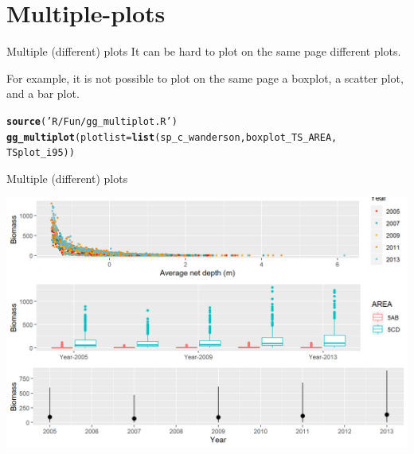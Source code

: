 \documentclass{beamer}\usepackage[]{graphicx}\usepackage[]{color}
\makeatletter
\newcommand{\hlstr}[1]{\textcolor[rgb]{0.192,0.494,0.8}{#1}}%
\newcommand{\hlstd}[1]{\textcolor[rgb]{0.345,0.345,0.345}{#1}}%
\newcommand{\hlkwc}[1]{\textcolor[rgb]{0.333,0.667,0.333}{#1}}%
\newcommand{\hlkwd}[1]{\textcolor[rgb]{0.737,0.353,0.396}{\textbf{#1}}}%
\newenvironment{kframe}{%
 \def\at@end@of@kframe{}%
 \ifinner\ifhmode%
  \def\at@end@of@kframe{\end{minipage}}%
  \begin{minipage}{\columnwidth}%
 \fi\fi%
 \def\FrameCommand##1{\hskip\@totalleftmargin \hskip-\fboxsep
 \colorbox{shadecolor}{##1}\hskip-\fboxsep
     \hskip-\linewidth \hskip-\@totalleftmargin \hskip\columnwidth}%
 \MakeFramed {\advance\hsize-\width
   \@totalleftmargin\z@ \linewidth\hsize
   \@setminipage}}%
 {\par\unskip\endMakeFramed%
 \at@end@of@kframe}
\newenvironment{knitrout}{}{} %
\makeatother
\begin{document}
\section{Multiple-plots}
\begin{frame}[fragile]{Multiple (different) plots}
It can be hard to plot on the same page different plots.

For example, it is not possible to plot on the same page a boxplot, a scatter plot, and a bar plot.

\begin{knitrout}\footnotesize
{}\color{fgcolor}\begin{kframe}
\begin{alltt}
\hlkwd{source}\hlstd{(}\hlstr{'R/Fun/gg_multiplot.R'}\hlstd{)}
\hlkwd{gg_multiplot}\hlstd{(}\hlkwc{plotlist} \hlstd{=} \hlkwd{list}\hlstd{(sp_c_wanderson, boxplot_TS_AREA,}
                             \hlstd{TSplot_i95))}
\end{alltt}
\end{kframe}
\end{knitrout}
\end{frame}

\begin{frame}[fragile]{Multiple (different) plots}
\begin{knitrout}\footnotesize
{}\color{fgcolor}

{\centering \includegraphics[width=.9\linewidth]{figure/multi_plot2-1} 

}



\end{knitrout}
\end{frame}
\end{document}
